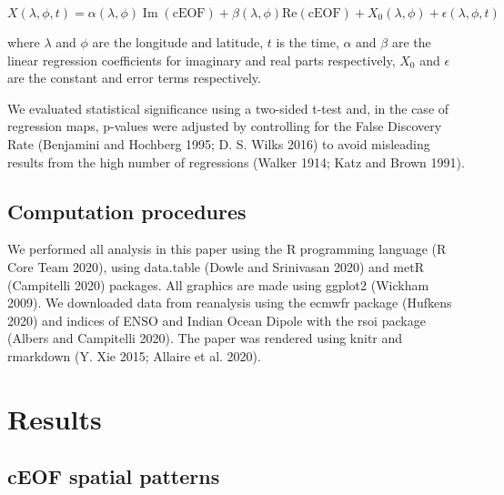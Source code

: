 \documentclass[smallextended]{svjour3}       %
\begin{document}
\[
X(\lambda, \phi, t) = \alpha(\lambda, \phi) \operatorname{Im}(\mathrm{cEOF}) + \beta(\lambda, \phi) \mathrm{Re}(\mathrm{cEOF}) + X_0(\lambda, \phi) + \epsilon(\lambda, \phi, t)
\]

where \(\lambda\) and \(\phi\) are the longitude and latitude, \(t\) is the time, \(\alpha\) and \(\beta\) are the linear regression coefficients for imaginary and real parts respectively, \(X_0\) and \(\epsilon\) are the constant and error terms respectively.

We evaluated statistical significance using a two-sided t-test and, in the case of regression maps, p-values were adjusted by controlling for the False Discovery Rate (Benjamini and Hochberg 1995; D. S. Wilks 2016) to avoid misleading results from the high number of regressions (Walker 1914; Katz and Brown 1991).

\hypertarget{computation-procedures}{%
\subsection{Computation procedures}\label{computation-procedures}}

We performed all analysis in this paper using the R programming language (R Core Team 2020), using data.table (Dowle and Srinivasan 2020) and metR (Campitelli 2020) packages.
All graphics are made using ggplot2 (Wickham 2009).
We downloaded data from reanalysis using the ecmwfr package (Hufkens 2020) and indices of ENSO and Indian Ocean Dipole with the rsoi package (Albers and Campitelli 2020).
The paper was rendered using knitr and rmarkdown (Y. Xie 2015; Allaire et al. 2020).

\hypertarget{results}{%
\section{Results}\label{results}}

\hypertarget{spatial}{%
\subsection{cEOF spatial patterns}\label{spatial}}
\end{document}
